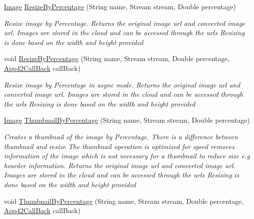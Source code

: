 \begin{DoxyCompactItemize}
\hyperlink{classcom_1_1shephertz_1_1app42_1_1paas_1_1sdk_1_1csharp_1_1image_processor_1_1_image}{Image} \hyperlink{classcom_1_1shephertz_1_1app42_1_1paas_1_1sdk_1_1csharp_1_1image_processor_1_1_image_processor_service_a8bb76a9cf8189e3dedcf5cd0dbf6c065}{Resize\+By\+Percentage} (String name, Stream stream, Double percentage)
\begin{DoxyCompactList}\small\item\em Resize image by Percentage. Returns the original image url and converted image url. Images are stored in the cloud and can be accessed through the urls Resizing is done based on the width and height provided \end{DoxyCompactList}\item 
void \hyperlink{classcom_1_1shephertz_1_1app42_1_1paas_1_1sdk_1_1csharp_1_1image_processor_1_1_image_processor_service_acf8b2d0182c43291ea8fa7817e4f55d9}{Resize\+By\+Percentage} (String name, Stream stream, Double percentage, \hyperlink{interfacecom_1_1shephertz_1_1app42_1_1paas_1_1sdk_1_1csharp_1_1_app42_call_back}{App42\+Call\+Back} call\+Back)
\begin{DoxyCompactList}\small\item\em Resize image by Percentage in async mode. Returns the original image url and converted image url. Images are stored in the cloud and can be accessed through the urls Resizing is done based on the width and height provided \end{DoxyCompactList}\item 
\hyperlink{classcom_1_1shephertz_1_1app42_1_1paas_1_1sdk_1_1csharp_1_1image_processor_1_1_image}{Image} \hyperlink{classcom_1_1shephertz_1_1app42_1_1paas_1_1sdk_1_1csharp_1_1image_processor_1_1_image_processor_service_a505e21aa6cb69415a4cdc7531e826df2}{Thumbnail\+By\+Percentage} (String name, Stream stream, Double percentage)
\begin{DoxyCompactList}\small\item\em Creates a thumbnail of the image by Percentage. There is a difference between thumbnail and resize The thumbnail operation is optimized for speed removes information of the image which is not necessary for a thumbnail to reduce size e.\+g hearder information. Returns the original image url and converted image url. Images are stored in the cloud and can be accessed through the urls Resizing is done based on the width and height provided \end{DoxyCompactList}\item 
void \hyperlink{classcom_1_1shephertz_1_1app42_1_1paas_1_1sdk_1_1csharp_1_1image_processor_1_1_image_processor_service_a64c8f9c6cadcff5f7811ae2c9204c80b}{Thumbnail\+By\+Percentage} (String name, Stream stream, Double percentage, \hyperlink{interfacecom_1_1shephertz_1_1app42_1_1paas_1_1sdk_1_1csharp_1_1_app42_call_back}{App42\+Call\+Back} call\+Back)

\end{DoxyCompactItemize}
